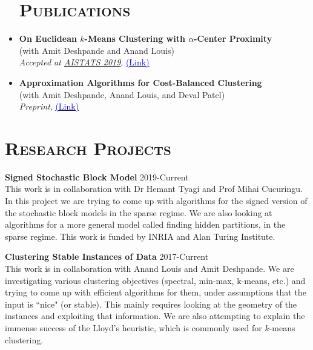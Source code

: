 \documentclass[line,margin]{res}
\begin{document}
\begin{resume}
\begin{itemize}
\section{\textsc{Publications}}
                \item {\bf On Euclidean $k$-Means Clustering with $\alpha$-Center Proximity}\\
                (with Amit Deshpande and Anand Louis) \\
                \emph{ Accepted at \href{http://proceedings.mlr.press/v89/deshpande19a.html}{AISTATS 2019}},  \href{https://arxiv.org/abs/1804.10827}{\textcolor{blue}{(Link)}}

                \item {\bf Approximation Algorithms for Cost-Balanced Clustering}\\
                (with Amit Deshpande, Anand Louis, and Deval Patel) \\
                \emph{ Preprint}, \href{https://www.dropbox.com/s/r5uwemki3zfvvyb/min_max_km.pdf?dl=0}{\textcolor{blue}{(Link)}}
\end{itemize}
\section{\textsc{Research Projects}}
              {\bf Signed Stochastic Block Model} \hfill 2019-Current\\
              This work is in collaboration with Dr Hemant Tyagi and Prof Mihai Cucuringu. In this project we are trying to come up with algorithms for the signed version of the stochastic block models in the sparse regime. We are also looking at algorithms for a more general model called finding hidden partitions, in the sparse regime. This work is funded by INRIA and Alan Turing Institute.


              {\bf Clustering Stable Instances of Data} \hfill
                2017-Current\\
              This work is in collaboration with Anand Louis and Amit Deshpande. We are investigating various clustering objectives (spectral, min-max, k-means, etc.) and trying to come up with efficient algorithms for them, under assumptions that the input is ``nice" (or stable). This mainly requires looking at the geometry of the instances and exploiting that information. We are also attempting to explain the immense success of the Lloyd's heuristic, which is commonly used for $k$-means clustering.


\end{resume}
\end{document}

